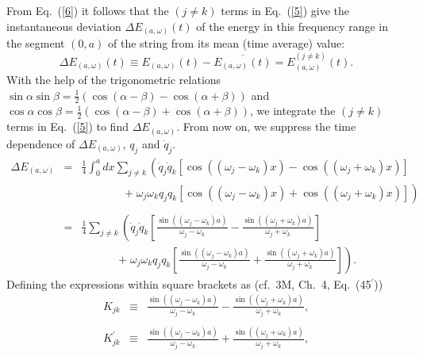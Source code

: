 \documentclass{elsart}
\begin{document}
From Eq.\  (\ref{6}) it follows that the $(j \neq k)$ terms in Eq.\ (\ref{5}) give the instantaneous deviation $\Delta E_{(a, \omega)}(t)$ of the energy in this frequency range in the segment $(0,a)$ of the string from its mean (time average) value:
\begin{equation}
\Delta E_{(a, \omega)}(t) \equiv E_{(a, \omega)}(t) -  \overline{E_{(a, \omega)}(t)} = E_{(a, \omega)}^{(j \neq k)}(t).
\label{9}
\end{equation}
With the help of the trigonometric relations $\sin{\alpha}\sin{\beta} = \frac{1}{2} (\cos{(\alpha - \beta)} - \cos{(\alpha + \beta)})$ and  $\cos{\alpha}\cos{\beta} = \frac{1}{2} (\cos{(\alpha - \beta)} + \cos{(\alpha + \beta)})$, we integrate the $(j \neq k)$ terms  in Eq.\ (\ref{5}) to find $\Delta E_{(a, \omega)}$. From now on, we suppress the time dependence of $\Delta E_{(a, \omega)}$, $q_j$ and $\dot{q}_j$.
\begin{eqnarray}
\Delta E_{(a, \omega)} & = & \frac{1}{4}  \int_0^a dx \sum_{j \neq k} \left( \dot{q}_j \dot{q}_k 
\left[ \cos{((\omega_j - \omega_k)x)} - \cos{((\omega_j + \omega_k)x)}\right]  \right. \nonumber \\
& & \;\;\;\;\;\;\;\;\;\;\;\;\;\; \left. +  \;  \omega_j \omega_k q_j q_k 
\left[ \cos{((\omega_j - \omega_k)x)} + \cos{((\omega_j + \omega_k)x)}\right] \right) \nonumber \\
 & & \label{11} \\
 & = & \frac{1}{4}  \sum_{j \neq k} \left( \dot{q}_j \dot{q}_k 
 \left[ \frac{\sin{((\omega_j - \omega_k)a)}}{\omega_j - \omega_k} -  
 \frac{\sin{((\omega_j + \omega_k)a)}}{\omega_j + \omega_k} \right] \right. \nonumber \\  
& & \;\;\;\;\;\;\;\;\;\;\;\; \left. + \;  \omega_j \omega_k q_j q_k 
\left[ \frac{\sin{((\omega_j - \omega_k)a)}}{\omega_j - \omega_k} +  
 \frac{\sin{((\omega_j + \omega_k)a)}}{\omega_j + \omega_k} \right]  \right). \nonumber
\end{eqnarray}
Defining the expressions within square brackets as (cf.\ 3M, Ch.\ 4, Eq.\ (45$^\prime$))
\begin{eqnarray}
K_{jk} & \equiv &  \frac{\sin{((\omega_j - \omega_k)a)}}{\omega_j - \omega_k} -  
 \frac{\sin{((\omega_j + \omega_k)a)}}{\omega_j + \omega_k}, \nonumber \\
 & & \label{11a} \\
K^\prime_{jk} & \equiv & \frac{\sin{((\omega_j - \omega_k)a)}}{\omega_j - \omega_k} +  
 \frac{\sin{((\omega_j + \omega_k)a)}}{\omega_j + \omega_k}, \nonumber
\end{eqnarray}
\end{document}
